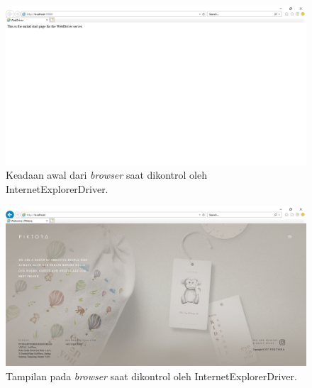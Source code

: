 \begin{enumerate}
\begin{figure}[H]
	\centering
		\includegraphics[scale=0.4]{Gambar/IE_awal.png}
	\caption{Keadaan awal dari \textit{browser} saat dikontrol oleh InternetExplorerDriver.}
	\label{fig:ie_awal}
\end{figure}

\begin{figure}[H]
	\centering
		\includegraphics[scale=0.4]{Gambar/IE.png}
	\caption{Tampilan pada \textit{browser} saat dikontrol oleh InternetExplorerDriver. }
	\label{fig:ie}
\end{figure}




\end{enumerate}
